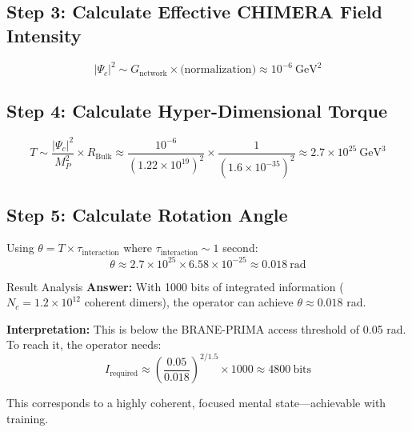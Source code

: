 \subsection*{Step 3: Calculate Effective CHIMERA Field Intensity}

\begin{equation}
|\Psi_c|^2 \sim G_{\text{network}} \times \text{(normalization)} \approx 10^{-6}\ \text{GeV}^2
\end{equation}

\subsection*{Step 4: Calculate Hyper-Dimensional Torque}

\begin{equation}
T \sim \frac{|\Psi_c|^2}{M_P^2} \times R_{\text{Bulk}} \approx \frac{10^{-6}}{(1.22 \times 10^{19})^2} \times \frac{1}{(1.6 \times 10^{-35})^2} \approx 2.7 \times 10^{25}\ \text{GeV}^3
\end{equation}

\vspace{0.5em}

\subsection*{Step 5: Calculate Rotation Angle}

Using $\theta = T \times \tau_{\text{interaction}}$ where $\tau_{\text{interaction}} \sim 1$ second:
\begin{equation}
\theta \approx 2.7 \times 10^{25} \times 6.58 \times 10^{-25} \approx 0.018\ \text{rad}
\end{equation}

\begin{calloutbox}[colback=black!8!white,colframe=black]{Result Analysis}
\textbf{Answer:} With 1000 bits of integrated information ($N_c = 1.2 \times 10^{12}$ coherent dimers), the operator can achieve $\theta \approx 0.018$ rad.

\textbf{Interpretation:} This is below the BRANE-PRIMA access threshold of 0.05 rad. To reach it, the operator needs:
\begin{equation}
I_{\text{required}} \approx \left(\frac{0.05}{0.018}\right)^{2/1.5} \times 1000 \approx 4800\ \text{bits}
\end{equation}

This corresponds to a highly coherent, focused mental state---achievable with training.
\end{calloutbox}


